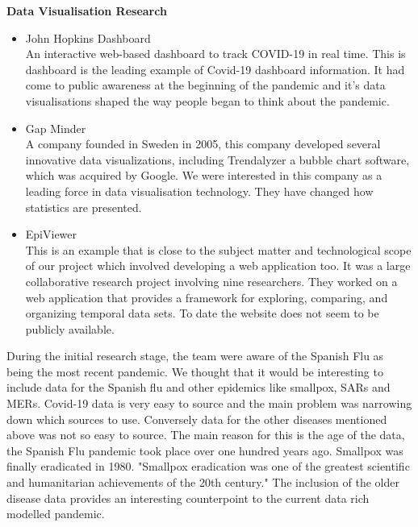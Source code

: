 \textbf{Data Visualisation Research}
\begin{itemize}
    \item John Hopkins Dashboard\\
            An interactive web-based dashboard to track COVID-19 in real time. This is dashboard is the leading example of Covid-19 dashboard information. It had come to public awareness at the beginning of the pandemic and it's data visualisations shaped the way people began to think about the pandemic.
    \item Gap Minder\\
            A company founded in Sweden in 2005, this company developed several innovative data visualizations, including 
            Trendalyzer a bubble chart software, which was acquired by Google.\cite{bubble}
            We were interested in this company as a leading force in data visualisation technology. They have changed how
            statistics are presented.
            
    \item EpiViewer\\
            This is an example that is close to the subject matter and technological scope of our project which involved developing a web application too. It was a large collaborative research project involving nine researchers. They worked on a web application that provides a framework for exploring, comparing, and organizing temporal data sets. To date the website does not seem to be publicly available.
    
\end{itemize}

During the initial research stage, the team were aware of the Spanish Flu as being the most recent pandemic. We thought that it would be interesting to include data for the Spanish flu and other epidemics like smallpox, SARs and MERs. Covid-19 data is very easy to source and the main problem was narrowing down which sources to use. Conversely data for the other diseases mentioned above was not so easy to source. The main reason for this is the age of the data, the Spanish Flu pandemic took place over one hundred years ago. Smallpox was finally eradicated in 1980. 
"Smallpox eradication was one of the greatest scientific and humanitarian achievements of the 20th century."\cite{Smallpox} The inclusion of the older disease data provides an interesting counterpoint to the current data rich modelled pandemic.

\vspace{2mm}

